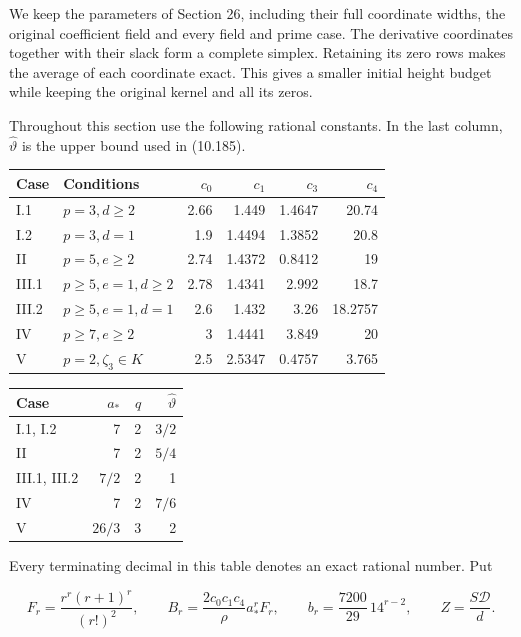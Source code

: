 \documentclass[
  11pt,
  a4paper,
]{article}
\newcounter{none} %
\begin{document}
We keep the parameters of Section 26, including their full coordinate
widths, the original coefficient field and every field and prime case.
The derivative coordinates together with their slack form a complete
simplex. Retaining its zero rows makes the average of each coordinate
exact. This gives a smaller initial height budget while keeping the
original kernel and all its zeros.

Throughout this section use the following rational constants. In the
last column, \(\widehat\vartheta\) is the upper bound used in (10.185).

{\def\LTcaptype{none} %
\begin{longtable}[]{@{}llrrrr@{}}
\toprule\noalign{}
Case & Conditions & \(c_0\) & \(c_1\) & \(c_3\) & \(c_4\) \\
\midrule\noalign{}
\endhead
\bottomrule\noalign{}
\endlastfoot
I.1 & \(p=3,d\ge2\) & 2.66 & 1.449 & 1.4647 & 20.74 \\
I.2 & \(p=3,d=1\) & 1.9 & 1.4494 & 1.3852 & 20.8 \\
II & \(p=5,e\ge2\) & 2.74 & 1.4372 & 0.8412 & 19 \\
III.1 & \(p\ge5,e=1,d\ge2\) & 2.78 & 1.4341 & 2.992 & 18.7 \\
III.2 & \(p\ge5,e=1,d=1\) & 2.6 & 1.432 & 3.26 & 18.2757 \\
IV & \(p\ge7,e\ge2\) & 3 & 1.4441 & 3.849 & 20 \\
V & \(p=2,\zeta_3\in K\) & 2.5 & 2.5347 & 0.4757 & 3.765 \\
\end{longtable}
}

{\def\LTcaptype{none} %
\begin{longtable}[]{@{}lrrr@{}}
\toprule\noalign{}
Case & \(a_*\) & \(q\) & \(\widehat\vartheta\) \\
\midrule\noalign{}
\endhead
\bottomrule\noalign{}
\endlastfoot
I.1, I.2 & 7 & 2 & \(3/2\) \\
II & 7 & 2 & \(5/4\) \\
III.1, III.2 & \(7/2\) & 2 & 1 \\
IV & 7 & 2 & \(7/6\) \\
V & \(26/3\) & 3 & 2 \\
\end{longtable}
}

Every terminating decimal in this table denotes an exact rational
number. Put

\[
F_r=\frac{r^r(r+1)^r}{(r!)^2},\qquad
B_r=\frac{2c_0c_1c_4}{\rho}a_*^rF_r,\qquad
b_r=\frac{7200}{29}\,14^{r-2},\qquad Z=\frac{S\mathcal D}{d}.
\tag{10.279}
\]
\end{document}
